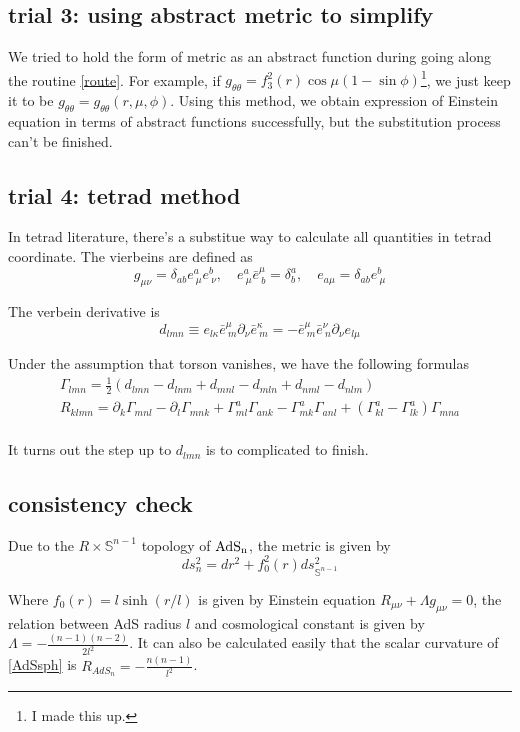 \documentclass[12pt, a4paper]{article}
\numberwithin{equation}{section}
\newcommand{\be}{\begin{equation}}
\newcommand{\ee}{\end{equation}}
\begin{document}
\subsection{trial 3: using abstract metric to simplify}
	We tried to hold the form of metric as an abstract function during going along the routine \ref{route}. For example, if $g_{\theta\theta} = f_3^2(r)\cos\mu (1-\sin\phi)$\footnote{I made this up.}, we just keep it to be $g_{\theta\theta} = g_{\theta\theta}(r,\mu,\phi)$. Using this method, we obtain expression of Einstein equation in terms of abstract functions successfully, but the substitution process can't be finished.
	
\subsection{trial 4: tetrad method\cite{Andy}}
	In tetrad literature, there's a substitue way to calculate all quantities in tetrad coordinate. The vierbeins are defined as
\be
	g_{\mu\nu} = \delta_{ab}e^a_{\ \mu}e^b_{\ \nu},\quad e^a_{\ \mu}\bar{e}^\mu_{\ b} = \delta^a_b,\quad e_{a\mu} = \delta_{ab}e^b_{\ \mu}
\ee

	The verbein derivative is
\be
	d_{lmn} \equiv  e_{l\kappa}\bar{e}^\mu_{\ m}\partial_\nu \bar{e}^\kappa_{\ m} = -\bar{e}^\mu_{\ m}\bar{e}^\nu_{\ n}\partial_\nu e_{l\mu}
\ee

	Under the assumption that torson vanishes, we have the following formulas
\be
\begin{aligned}
	\Gamma_{lmn} = \frac{1}{2}(d_{lmn}- d_{lnm} + d_{mnl} - d_{mln} + d_{nml}-d_{nlm})\\
	R_{klmn} = \partial_k \Gamma_{mnl} -\partial_l \Gamma_{mnk} + \Gamma^a_{ml}\Gamma_{ank}-\Gamma^a_{mk}\Gamma_{anl} + (\Gamma^a_{kl}-\Gamma^a_{lk})\Gamma_{mna}\\
\end{aligned}	
\ee

	It turns out the step up to $d_{lmn}$ is to complicated to finish.
	
\subsection{consistency check}
	Due to the $R\times \mathbb{S}^{n-1}$ topology of ${\rm AdS_n}$, the metric is given by
\be
	ds_n^2 = dr^2 + f^2_0(r) ds_{\mathbb{S}^{n-1}}^2
	\label{AdSsph}
\ee

	Where $f_0(r) = l\sinh(r/l)$ is given by Einstein equation $R_{\mu\nu} + \Lambda g_{\mu\nu} = 0$, the relation between AdS radius $l$ and cosmological constant is given by $\Lambda = -\frac{(n-1)(n-2)}{2l^2}$. It can also be calculated easily that the scalar curvature of \ref{AdSsph} is $R_{AdS_n} = - \frac{n(n-1)}{l^2}$. 
	
\end{document}
